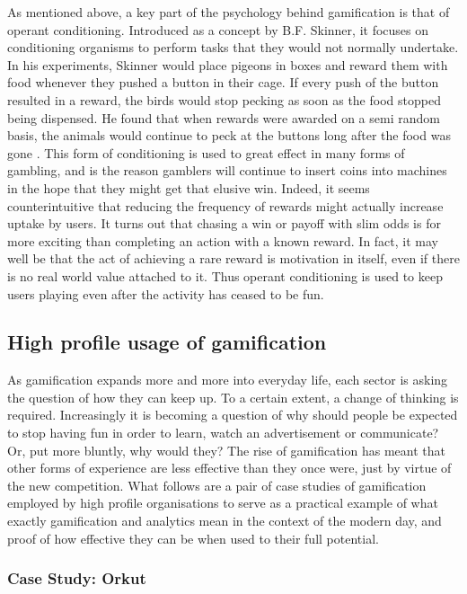 \documentclass{article}
\begin{document}
As mentioned above, a key part of the psychology behind gamification is that of operant conditioning. Introduced as a concept by B.F. Skinner, it focuses on conditioning organisms to perform tasks that they would not normally undertake. In his experiments, Skinner would place pigeons in boxes and reward them with food whenever they pushed a button in their cage. If every push of the button resulted in a reward, the birds would stop pecking as soon as the food stopped being dispensed. He found that when rewards were awarded on a semi random basis, the animals would continue to peck at the buttons long after the food was gone \cite{kapp2012gamification}. This form of conditioning is used to great effect in many forms of gambling, and is the reason gamblers will continue to insert coins into machines in the hope that they might get that elusive win. Indeed, it seems counterintuitive that reducing the frequency of rewards might actually increase uptake by users. It turns out that chasing a win or payoff with slim odds is for more exciting than completing an action with a known reward. In fact, it may well be that the act of achieving a rare reward is motivation in itself, even if there is no real world value attached to it. Thus operant conditioning is used to keep users playing even after the activity has ceased to be fun.

\subsection{High profile usage of gamification}
As gamification expands more and more into everyday life, each sector is asking the question of how they can keep up. To a certain extent, a change of thinking is required. Increasingly it is becoming a question of why should people be expected to stop having fun in order to learn, watch an advertisement or communicate? \cite{zichermann2010game} Or, put more bluntly, why would they? The rise of gamification has meant that other forms of experience are less effective than they once were, just by virtue of the new competition. What follows are a pair of case studies of gamification employed by high profile organisations to serve as a practical example of what exactly gamification and analytics mean in the context of the modern day, and proof of how effective they can be when used to their full potential.

\subsubsection{Case Study: Orkut}
\end{document}
